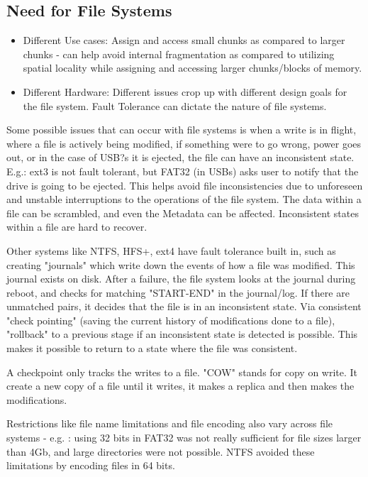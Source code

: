 \documentclass[twoside]{article}
\begin{document}
\subsection{Need for File Systems}
\begin{itemize}
\item Different Use cases: Assign and access small chunks as compared to larger chunks - can help avoid internal fragmentation as compared to utilizing spatial locality while assigning and accessing larger chunks/blocks of memory. 

\item Different Hardware: Different issues crop up with different design goals for the file system. Fault Tolerance can dictate the nature of file systems. 
\end{itemize}
Some possible issues that can occur with file systems is when a write is in flight, where a file is actively being modified, if something were to go wrong, power goes out, or in the case of USB?s it is ejected, the file can have an inconsistent state. 
E.g.: ext3 is not fault tolerant, but FAT32 (in USBs) asks user to notify that the drive is going to be ejected. This helps avoid file inconsistencies due to unforeseen and unstable interruptions to the operations of the file system. The data within a file can be scrambled, and even the Metadata can be affected. Inconsistent states within a file are hard to recover. 

Other systems like NTFS, HFS+, ext4 have fault tolerance built in, such as creating "journals" which write down the events of how a file was modified. This journal exists on disk. After a failure, the file system looks at the journal during reboot, and checks for matching "START-END" in the journal/log. If there are unmatched pairs, it decides that the file is in an inconsistent state. 
Via consistent "check pointing" (saving the current history of modifications done to a file), "rollback" to a previous stage if an inconsistent state is detected is possible. This makes it possible to return to a state where the file was consistent.

A checkpoint only tracks the writes to a file. "COW" stands for copy on write. It create a new copy of a file until it writes, it makes a replica and then makes the modifications.

Restrictions like file name limitations and file encoding also vary across file systems - e.g. : using 32 bits in FAT32 was not really sufficient for file sizes larger than 4Gb, and large directories were not possible. NTFS avoided these limitations by encoding files in 64 bits. 
\end{document}
